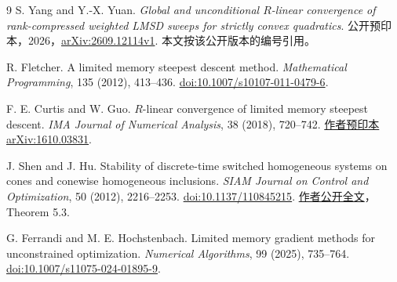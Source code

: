 \documentclass[UTF8,zihao=-4,a4paper]{ctexart}
\theoremstyle{definition}\newtheorem{example}[theorem]{例}
\begin{document}
\begin{thebibliography}{9}
S. Yang and Y.-X. Yuan.
\emph{Global and unconditional $R$-linear convergence of rank-compressed weighted LMSD sweeps for strictly convex quadratics}.
公开预印本，2026，\href{https://arxiv.org/abs/2609.12114v1}{arXiv:2609.12114v1}.
本文按该公开版本的编号引用。

R. Fletcher.
A limited memory steepest descent method.
\emph{Mathematical Programming}, 135 (2012), 413--436.
\href{https://doi.org/10.1007/s10107-011-0479-6}{doi:10.1007/s10107-011-0479-6}.

F. E. Curtis and W. Guo.
$R$-linear convergence of limited memory steepest descent.
\emph{IMA Journal of Numerical Analysis}, 38 (2018), 720--742.
\href{https://arxiv.org/abs/1610.03831}{作者预印本 arXiv:1610.03831}.

J. Shen and J. Hu.
Stability of discrete-time switched homogeneous systems on cones and conewise homogeneous inclusions.
\emph{SIAM Journal on Control and Optimization}, 50 (2012), 2216--2253.
\href{https://doi.org/10.1137/110845215}{doi:10.1137/110845215}.
\href{https://engineering.purdue.edu/~jianghai/Publication/SICON2011_SHLS_Cone.pdf}{作者公开全文}，Theorem 5.3.

G. Ferrandi and M. E. Hochstenbach.
Limited memory gradient methods for unconstrained optimization.
\emph{Numerical Algorithms}, 99 (2025), 735--764.
\href{https://doi.org/10.1007/s11075-024-01895-9}{doi:10.1007/s11075-024-01895-9}.
\end{thebibliography}
\end{document}
